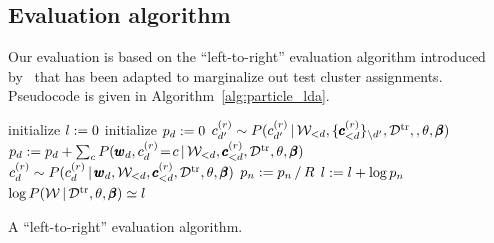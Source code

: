 \documentclass[]{article}
\begin{document}


\begin{appendix}

\section{Evaluation algorithm} \label{leftright}

Our evaluation is based on the ``left-to-right'' evaluation algorithm introduced by~\cite{Wal08} that has been adapted to
marginalize out test cluster assignments. Pseudocode is given in Algorithm~\ref{alg:particle_lda}.
\begin{algorithm}[ht]
\begin{algorithmic}[1]
{\small
\STATE initialize $l := 0$
\STATE initialize $p_d := 0$
\STATE $c^{(r)}_{d'} \sim P(c^{(r)}_{d'} \,|\, \mathcal{W}_{<d},
\{
\pmb{c}^{(r)}_{< d} \}_{\setminus
  {d'}}, \mathcal{D}^{\textrm{tr}},,\theta, \pmb{\beta})$
\ENDFOR
\STATE $p_d := p_d + \sum_c P(\pmb{w}_d, c^{(r)}_d \!=\! c \,|\,
\mathcal{W}_{<d},\pmb{c}^{(r)}_{<d}, \mathcal{D}^{\textrm{tr}},\theta, \pmb{\beta})$
\STATE $c^{(r)}_d \sim P(c^{(r)}_d \,|\, \pmb{w}_d, \mathcal{W}_{<d},\pmb{c}^{(r)}_{<d},\mathcal{D}^{\textrm{tr}},\theta,\pmb{\beta})$
\ENDFOR
\STATE $p_n := p_n \,/\, R$
\STATE $l := l + \log{p_n}$
\ENDFOR
\STATE $\log{P(\mathcal{W} \,|\,\mathcal{D}^{\textrm{tr}}, \theta, \pmb{\beta})} \simeq l$
}
\end{algorithmic}
\caption{A ``left-to-right'' evaluation algorithm.}
\label{alg:particle_lda}
\end{algorithm}

\end{appendix}
\end{document}
